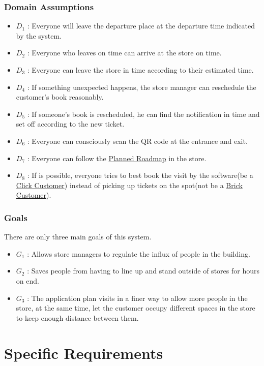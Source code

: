 \documentclass[a4paper,12pt]{book}
\begin{document}
\subsection{Domain Assumptions}
\begin{itemize}
	\item $D_1$ : Everyone will leave the departure place at the departure time indicated by the system.
	\item $D_2$ : Everyone who leaves on time can arrive at the store on time.
	\item $D_3$ : Everyone can leave the store in time according to their estimated time.
	\item $D_4$ : If something unexpected happens, the store manager can reschedule the customer's book reasonably.
	\item $D_5$ : If someone’s book is rescheduled, he can find the notification in time and set off according to the new ticket.
	\item $D_6$ : Everyone can consciously scan the QR code at the entrance and exit.
	\item $D_7$ : Everyone can follow the \hyperref[Definitions]{Planned Roadmap} in the store.
	\item $D_8$ : If is possible, everyone tries to best book the visit by the software(be a \hyperref[Definitions]{Click Customer}) instead of picking up tickets on the spot(not be a \hyperref[Definitions]{Brick Customer}).
\end{itemize}

\subsection{Goals}
There are only three main goals of this system.
\begin{itemize}
	\item $G_1$ : Allows store managers to regulate the influx of people in the building.
	\item $G_2$ : Saves people from having to line up and stand outside of stores for hours on end.
	\item $G_3$ : The application plan visits in a finer way to allow more people in the store, at the same time, let the customer occupy different spaces in the store to keep enough distance between them.
\end{itemize}

\chapter{Specific Requirements} \label{C3:SpecificRequirements}
\end{document}
